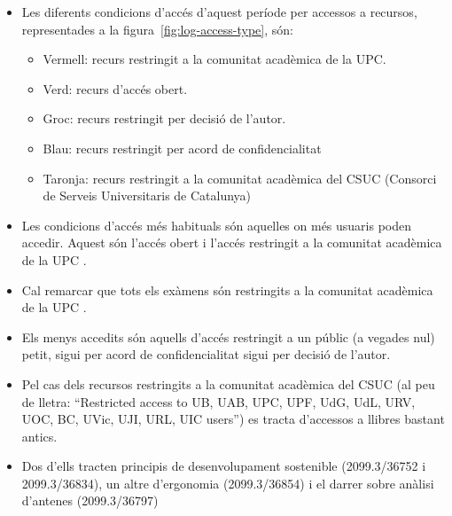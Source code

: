 \begin{itemize}
    \item Les diferents condicions d'accés d'aquest període per accessos a recursos, representades a la figura~\ref{fig:log-access-type}, són:
    \begin{itemize}
        \item Vermell: recurs restringit a la comunitat acadèmica de la UPC.
        \item Verd: recurs d'accés obert.
        \item Groc: recurs restringit per decisió de l'autor.
        \item Blau: recurs restringit per acord de confidencialitat
        \item Taronja: recurs restringit a la comunitat acadèmica del CSUC (Consorci de Serveis Universitaris de Catalunya)
    \end{itemize}

    \item Les condicions d'accés més habituals són aquelles on més usuaris poden accedir.
    Aquest són l'accés obert i l'accés restringit a la comunitat acadèmica de la UPC .
    \item Cal remarcar que tots els exàmens són restringits a la comunitat acadèmica de la UPC .
    \item Els menys accedits són aquells d'accés restringit a un públic (a vegades nul) petit, sigui per acord de confidencialitat sigui per decisió de l'autor.
    \clearpage
    \item Pel cas dels recursos restringits a la comunitat acadèmica del CSUC (al peu de lletra: “Restricted access to UB, UAB, UPC, UPF, UdG, UdL, URV, UOC, BC, UVic, UJI, URL, UIC users”) es tracta d'accessos a llibres bastant antics.
    \item Dos d'ells tracten principis de desenvolupament sostenible (2099.3/36752 i 2099.3/36834), un altre d'ergonomia (2099.3/36854) i el darrer sobre anàlisi d'antenes (2099.3/36797)

\end{itemize}